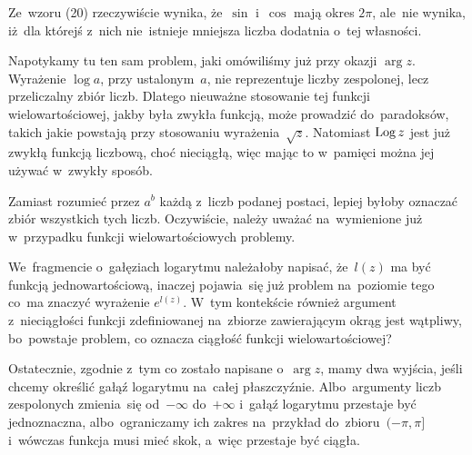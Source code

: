 \documentclass[a4paper,11pt]{article}
\begin{document}
\vspace{\spaceFour}



\start {} Ze~wzoru (20) rzeczywiście wynika, że~$\sin$ i~$\cos$
mają okres $2\pi$, ale~nie wynika, iż~dla którejś z~nich nie~istnieje
mniejsza liczba dodatnia o~tej własności.

\vspace{\spaceFour}



\start {} Napotykamy tu ten sam problem, jaki omówiliśmy już
przy okazji $\arg z$. Wyrażenie $\log a$, przy ustalonym~$a$, nie
reprezentuje liczby zespolonej, lecz przeliczalny zbiór liczb. Dlatego
nieuważne stosowanie tej funkcji wielowartościowej, jakby była zwykła
funkcją, może prowadzić do~paradoksów, takich jakie powstają przy
stosowaniu wyrażenia~$\sqrt{ z }$. Natomiast $\operatorname{Log} z$ jest już zwykłą
funkcją liczbową, choć nieciągłą, więc mając to w~pamięci można jej
używać w~zwykły sposób.

\vspace{\spaceFour}



\start {} Zamiast rozumieć przez $a^{ b }$ każdą z~liczb podanej
postaci, lepiej byłoby oznaczać zbiór wszystkich tych liczb.
Oczywiście, należy uważać na~wymienione już w~przypadku funkcji
wielowartościowych problemy.

\vspace{\spaceFour}



\start {} We~fragmencie o~gałęziach logarytmu należałoby
napisać, że~$l( z )$ ma być funkcją jednowartościową, inaczej
pojawia~się już problem na~poziomie tego co~ma znaczyć wyrażenie
$e^{ l( z ) }$. W~tym kontekście również argument z~nieciągłości
funkcji zdefiniowanej na~zbiorze zawierającym okrąg jest wątpliwy,
bo~powstaje problem, co oznacza ciągłość funkcji wielowartościowej?

Ostatecznie, zgodnie z~tym co zostało napisane o~$\arg z$, mamy dwa
wyjścia, jeśli chcemy określić gałąź logarytmu na~całej płaszczyźnie.
Albo~argumenty liczb zespolonych zmienia~się od~$-\infty$ do~$+\infty$
i~gałąź logarytmu przestaje być jednoznaczna, albo~ograniczamy ich
zakres na~przykład do~zbioru~$( -\pi, \pi ]$ i~wówczas funkcja musi
mieć skok, a~więc przestaje być ciągła.

\vspace{\spaceFour}
\end{document}
